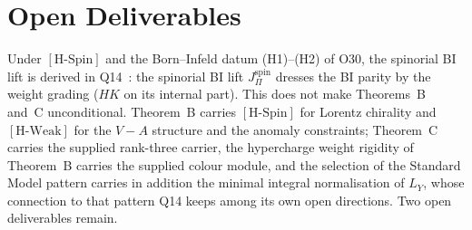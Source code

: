 \documentclass[11pt,a4paper]{article}
\theoremstyle{definition}
\newcommand{\HSpin}{\ensuremath{[\mathrm{H\text{-}Spin}]}}
\newcommand{\HWeak}{\ensuremath{[\mathrm{H\text{-}Weak}]}}
\newcommand{\JBI}{{J^{\mathrm{spin}}_\Pi}}
\begin{document}
  \section{Open Deliverables}
    \label{sec:open}

    Under \HSpin{} and the Born--Infeld datum (H1)--(H2) of O30, the spinorial BI lift is derived in
    Q14~\cite{Beau2026q14}: the spinorial BI lift $\JBI$ dresses the BI parity by the weight grading ($HK$ on its
    internal part).
    This does not make Theorems~B and~C unconditional.
    Theorem~B carries \HSpin{} for Lorentz chirality and \HWeak{} for the $V-A$ structure and the anomaly
    constraints; Theorem~C carries the supplied rank-three carrier, the hypercharge weight rigidity of Theorem~B
    carries the supplied colour module, and the selection of the Standard Model pattern carries in addition the
    minimal integral normalisation of $L_Y$, whose connection to that pattern Q14 keeps among its own open directions.
    Two open deliverables remain.
\end{document}
